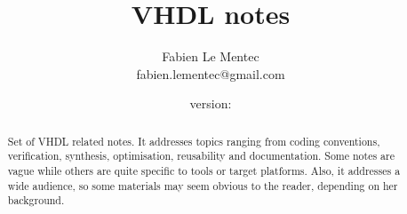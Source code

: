 \documentclass[12pt]{article}
\begin{document}

\newcommand{\note}[1]
{\newpage\section{#1}\label{note:#1}}

\newcommand{\topics}[1]
{\paragraph{}\small{\textit{topics: #1}}}

\newcommand{\related}[1]
{\paragraph{}\small{\textit{related notes: \ref{note:#1}}}}

\newcommand{\todo}[1]
{\paragraph{}\textbf{TODO}: #1}

{\newline\lstset{language=VHDL, frame=single}}{}

{\newline\lstset{frame=single}}{}

\newcommand{\longurl}[2]
{\url{#1#2}}

\newcommand{\longlongurl}[3]
{\url{#1#2#3}}




\title{VHDL notes}
\author{Fabien Le Mentec \\ fabien.lementec@gmail.com}

{}{\newcommand{\version}{none}}
\date{\small{version: \version}}

\maketitle

\begin{abstract}
Set of VHDL related notes. It addresses topics ranging from coding
conventions, verification, synthesis, optimisation, reusability
and documentation. Some notes are vague while others are quite
specific to tools or target platforms. Also, it addresses a wide
audience, so some materials may seem obvious to the reader,
depending on her background.
\end{abstract}
\end{document}
